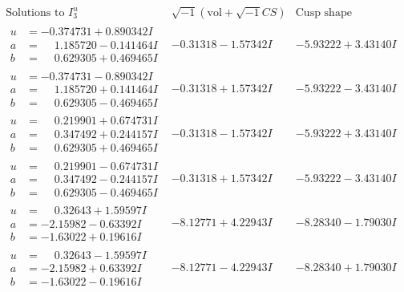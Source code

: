 \documentclass[1p]{elsarticle_modified}
\theoremstyle{definition}
\newcommand{\I}{\sqrt{-1}}
\begin{document}
$$\begin{array}{c|c|c}  
\text{Solutions to }I^u_{3}& \I (\text{vol} + \sqrt{-1}CS) & \text{Cusp shape}\\
 \hline 
\begin{aligned}
u &= -0.374731 + 0.890342 I \\
a &= \phantom{-}1.185720 - 0.141464 I \\
b &= \phantom{-}0.629305 + 0.469465 I\end{aligned}
 & -0.31318 - 1.57342 I & -5.93222 + 3.43140 I \\ \hline\begin{aligned}
u &= -0.374731 - 0.890342 I \\
a &= \phantom{-}1.185720 + 0.141464 I \\
b &= \phantom{-}0.629305 - 0.469465 I\end{aligned}
 & -0.31318 + 1.57342 I & -5.93222 - 3.43140 I \\ \hline\begin{aligned}
u &= \phantom{-}0.219901 + 0.674731 I \\
a &= \phantom{-}0.347492 + 0.244157 I \\
b &= \phantom{-}0.629305 + 0.469465 I\end{aligned}
 & -0.31318 - 1.57342 I & -5.93222 + 3.43140 I \\ \hline\begin{aligned}
u &= \phantom{-}0.219901 - 0.674731 I \\
a &= \phantom{-}0.347492 - 0.244157 I \\
b &= \phantom{-}0.629305 - 0.469465 I\end{aligned}
 & -0.31318 + 1.57342 I & -5.93222 - 3.43140 I \\ \hline\begin{aligned}
u &= \phantom{-}0.32643 + 1.59597 I \\
a &= -2.15982 - 0.63392 I \\
b &= -1.63022 + 0.19616 I\end{aligned}
 & -8.12771 + 4.22943 I & -8.28340 - 1.79030 I \\ \hline\begin{aligned}
u &= \phantom{-}0.32643 - 1.59597 I \\
a &= -2.15982 + 0.63392 I \\
b &= -1.63022 - 0.19616 I\end{aligned}
 & -8.12771 - 4.22943 I & -8.28340 + 1.79030 I \\ \hline\begin{aligned}

\end{aligned}
\end{array}$$
\end{document}
